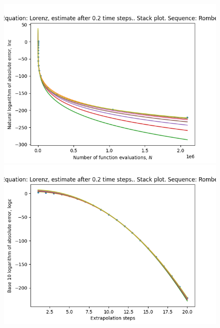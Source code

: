 \begin{figure}[H]
\centering
\begin{minipage}{0.45\textwidth}
\centering
\includegraphics[scale=0.45]{../results/emr_plots/lorenz_02_hp_romberg_stack.png}
\end{minipage}
\begin{minipage}{0.45\textwidth}
\centering
\includegraphics[scale=0.45]{../results/emr_plots/lorenz_02_hp_romberg_steps_stack.png}
\end{minipage}
\end{figure}

